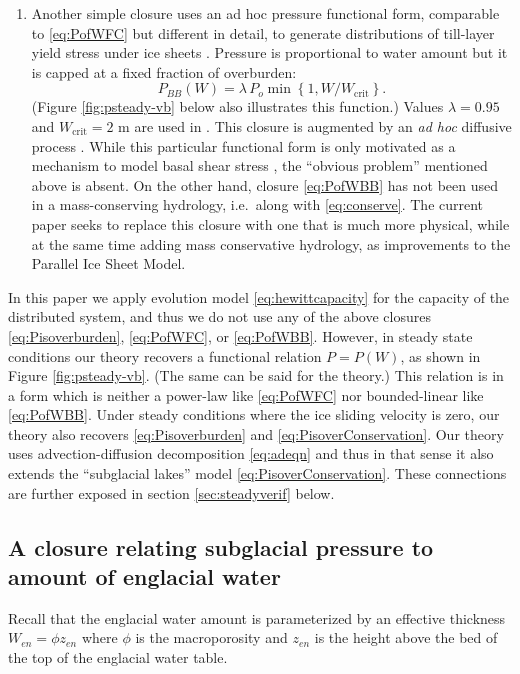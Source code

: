 \documentclass[11pt,final]{amsart}
\begin{document}
\begin{enumerate}
\item Another simple closure uses an ad hoc pressure functional form, comparable to \eqref{eq:PofWFC} but different in detail, to generate distributions of till-layer yield stress under ice sheets \citep{BBssasliding}.  Pressure is proportional to water amount but it is capped at a fixed fraction of overburden:
\begin{equation}
P_{BB}(W) = \lambda\,P_o \min\left\{1,W/W_{\text{crit}}\right\}. \label{eq:PofWBB}
\end{equation}
(Figure \ref{fig:psteady-vb} below also illustrates this function.)  Values $\lambda=0.95$ and $W_{\text{crit}}=2$ m are used in \citep{BBssasliding}.  This closure is augmented by an \emph{ad hoc} diffusive process \citep[equation (11) in][]{BBssasliding}.  While this particular functional form is only motivated as a mechanism to model basal shear stress \citep{Tulaczyketal2000b}, the ``obvious problem'' mentioned above is absent.  On the other hand, closure \eqref{eq:PofWBB} has not been used in a mass-conserving hydrology, i.e.~along with \eqref{eq:conserve}.  The current paper seeks to replace this closure with one that is much more physical, while at the same time adding mass conservative hydrology, as improvements to the Parallel Ice Sheet Model.
\end{enumerate}

In this paper we apply evolution model \eqref{eq:hewittcapacity} for the capacity of the distributed system, and thus we do not use any of the above closures \eqref{eq:Pisoverburden}, \eqref{eq:PofWFC}, or \eqref{eq:PofWBB}.  However, in steady state conditions our theory recovers a functional relation $P=P(W)$, as shown in Figure \ref{fig:psteady-vb}.  (The same can be said for the \cite{Schoofetal2012} theory.)  This relation is in a form which is neither a power-law like \eqref{eq:PofWFC} nor bounded-linear like \eqref{eq:PofWBB}.  Under steady conditions where the ice sliding velocity is zero, our theory also recovers \eqref{eq:Pisoverburden} and \eqref{eq:PisoverConservation}.  Our theory uses advection-diffusion decomposition \eqref{eq:adeqn} and thus in that sense it also extends the ``subglacial lakes'' model \eqref{eq:PisoverConservation}.  These connections are further exposed in section \ref{sec:steadyverif} below.

\subsection*{A closure relating subglacial pressure to amount of englacial water}  Recall that the englacial water amount is parameterized by an effective thickness $W_{en}=\phi z_{en}$ where $\phi$ is the macroporosity and $z_{en}$ is the height above the bed of the top of the englacial water table.
\end{document}
